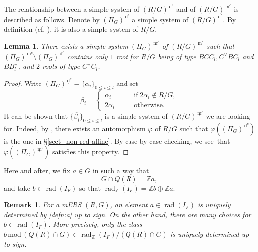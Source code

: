 \documentclass[11pt]{amsart}
\newcommand{\Z}{\mathbb{Z}}
\newcommand{\dc}{\,\underline{\mathrm{d}}^c}
\newcommand{\mc}{\, \underline{\mathrm{m}}^c}
\newtheorem{lemma}[thm]{Lemma}%
\newtheorem{rem}[thm]{Remark}%
\newcommand{\rad}{\operatorname{rad}}
\begin{document}
The relationship between a simple system of $(R/G)^{\dc}$ and 
of $(R/G)^{\mc}$ is described as follows.
Denote by  $(\Pi_G)^{\dc}$ a simple system of $(R/G)^{\dc}$. By definition (cf. \cite{Macdonald1972}), 
it is also a simple system of $R/G$. 
\begin{lemma} \label{lemma_base} 
There exists a simple system $(\Pi_G)^{\mc}$ of $(R/G)^{\mc}$ such that $(\Pi_G)^{\mc} \setminus (\Pi_G)^{\dc}$ 
contains only $1$ root for $R/G$ being of type $BCC_l, C^\vee BC_l$ and $BB_l^\vee$,
and $2$ roots of type $C^\vee C_l$.
\end{lemma}
\begin{proof}
Write $(\Pi_G)^{\dc}=\{\overline{\alpha_i}\}_{0\leq i\leq l}$ and set
\[ \overline{\beta_i}=\begin{cases} \overline{\alpha_i} \qquad & \text{if} \; 
2\overline{\alpha_i} \not\in R/G, \\
          2\overline{\alpha_i} \qquad & \text{otherwise}. \end{cases}
\]
It can be shown that $\{\overline{\beta_i}\}_{0\leq i\leq l}$ is a simple system of 
$(R/G)^{\mc}$ we are looking for. Indeed, by \cite{Bourbaki(Lie)4-6}, there 
exists an automorphism $\varphi$ of $R/G$ such that $\varphi((\Pi_G)^{\dc})$ is the one 
in \S  \ref{sect_non-red-affine}. By case by case checking, we see that 
$\varphi((\Pi_G)^{\mc})$ satisfies this property.
\end{proof}

Here and after, we fix $a \in G$ in such a way that 
\begin{equation}\label{defn:a}
G \cap Q(R)=\Z a,
\end{equation} 
and 
take $b \in \rad(I_F)$ so that $\rad_\Z(I_F)=\Z b \oplus 
\Z a$. 


\begin{rem}{\rm
For a mERS $(R,G)$, an element $a\in \rad(I_F)$ is uniquely determined by 
\eqref{defn:a} up to sign. On the other hand, there are
many choices for $b\in\rad(I_F)$. More precisely, 
only the class $b\,\mathrm{mod}\,(Q(R)\cap G) \in \rad_\Z(I_F)/(Q(R)\cap G)
$ is uniquely determined up to sign. }
\end{rem}
\end{document}
